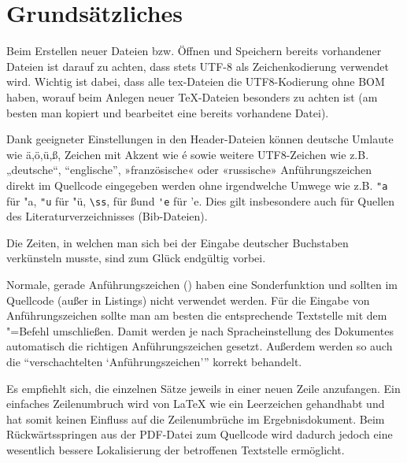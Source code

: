 \section[Grundsätzliches]{Grundsätzliches}%
\label{sec:Grundsätzliches}
%
Beim Erstellen neuer Dateien bzw. Öffnen und Speichern bereits vorhandener Dateien ist darauf zu achten,
dass stets UTF-8 als Zeichenkodierung verwendet wird.
Wichtig ist dabei, dass alle tex-Dateien die UTF8-Kodierung ohne BOM haben,
worauf beim Anlegen neuer TeX-Dateien besonders zu achten ist
(am besten man kopiert und bearbeitet eine bereits vorhandene Datei).

Dank geeigneter Einstellungen in den Header-Dateien können deutsche Umlaute wie 
%
ä,ö,ü,ß, Zeichen mit Akzent wie é sowie weitere UTF8-Zeichen wie z.B.
%
%
„deutsche“, “englische”, »französische« oder «russische» Anführungszeichen 
direkt im Quellcode eingegeben werden ohne irgendwelche Umwege wie z.B. 
\verb+"a+ für "a,
\verb+"u+ für "ü,
\verb+\ss+, für \ss und
\verb+'e+ für 'e.
Dies gilt insbesondere auch für Quellen des Literaturverzeichnisses (Bib-Dateien).

Die Zeiten, in welchen man sich bei der Eingabe deutscher Buchstaben verkünsteln musste,
sind zum Glück endgültig vorbei.

Normale, gerade Anführungszeichen (\texttt{{\dq}}) haben eine Sonderfunktion und sollten im Quellcode (außer in Listings) nicht verwendet werden.
Für die Eingabe von Anführungszeichen sollte man am besten die entsprechende Textstelle mit dem "=Befehl umschließen.
Damit werden je nach Spracheinstellung des Dokumentes automatisch die richtigen Anführungszeichen gesetzt.
Außerdem werden so auch die \enquote{verschachtelten \enquote{Anführungszeichen}} korrekt behandelt.

Es empfiehlt sich, die einzelnen Sätze jeweils in einer neuen Zeile anzufangen.
Ein einfaches Zeilenumbruch wird von LaTeX wie ein Leerzeichen gehandhabt
und hat somit keinen Einfluss auf die Zeilenumbrüche im Ergebnisdokument.
Beim Rückwärtsspringen aus der PDF-Datei zum Quellcode wird dadurch jedoch
eine wesentlich bessere Lokalisierung der betroffenen Textstelle ermöglicht.